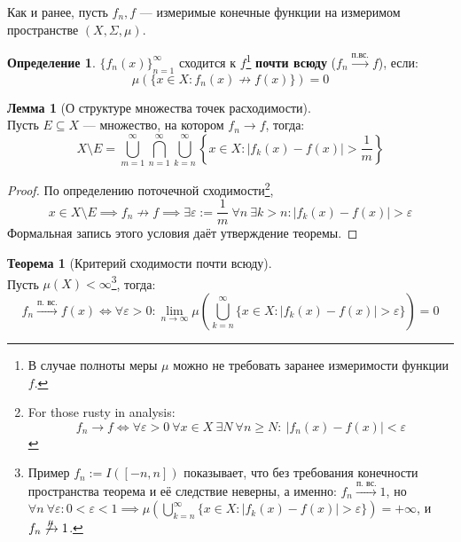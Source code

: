 \documentclass[11pt,a4paper]{report}
\def\eps{\varepsilon}
\theoremstyle{definition}
\theoremstyle{definition}
\newtheorem{theorem}{Теорема}[section]
\newtheorem{lemma}{Лемма}[section]
\theoremstyle{definition}
\newtheorem{definition}{Определение}[section]
\begin{document}
		\noindent Как и ранее, пусть $ f_{n}, f $ — измеримые конечные функции на измеримом пространстве $ (X, \Sigma, \mu) $.
		\begin{definition}
			$ \{f_{n}(x)\}_{n=1}^{\infty} $ сходится к $ f $\footnote{В случае полноты меры $ \mu $ можно не требовать заранее измеримости функции $ f $.} \textbf{почти всюду} ($ f_{n} \xrightarrow{\text{п.вс.}} f $), если: \[ \mu(\{x \in X: f_{n}(x) \not \rightarrow f(x) \}) = 0 \]
		\end{definition}
		\begin{lemma}[О структуре множества точек расходимости]$  $\\
			Пусть $ E \subseteq X $ — множество, на котором $ f_{n} \rightarrow f $, тогда:
			\[ X \setminus E = \bigcup\limits_{m=1}^{\infty}\bigcap\limits_{n=1}^{\infty}\bigcup\limits_{k=n}^{\infty}\left \{x \in X: |f_{k}(x) - f(x)| > \frac{1}{m} \right \} \]
		\end{lemma}
		\begin{proof} По определению поточечной сходимости\footnote{For those rusty in analysis: \[ f_{n} \rightarrow f \iff \forall \eps > 0\ \forall x \in X\ \exists N\ \forall n \ge N:\ |f_{n}(x) - f(x)| < \eps  \]}, 
			\[ x \in X \setminus E \implies f_{n} \not \rightarrow f \implies \exists \eps := \frac{1}{m}\ \forall n\ \exists k > n: |f_{k}(x) - f(x)| > \eps \]
			Формальная запись этого условия даёт утверждение теоремы.
		\end{proof}
		\begin{theorem}[Критерий сходимости почти всюду]$  $\\
			Пусть $ \mu(X) < \infty $\footnote{Пример $ f_{n} := I([-n, n]) $ показывает, что без требования конечности пространства теорема и её следствие неверны, а именно: $ f_{n} \xrightarrow{\text{п. вс.}} 1 $, но $ \forall n\ \forall \eps: 0 < \eps < 1 \implies \mu\left( \bigcup\limits_{k=n}^{\infty}\{x \in X: |f_{k}(x) - f(x)| > \eps \} \right) = +\infty $, и $ f_{n} \not \xrightarrow{\mu} 1 $.}, тогда: 
			\[ 
				f_{n} \xrightarrow{\text{п. вс.}} f(x) \iff \forall \eps > 0: \lim\limits_{n\to\infty}\mu\left( \bigcup\limits_{k=n}^{\infty}\{x \in X: |f_{k}(x) - f(x)| > \eps \} \right) = 0
			\]
		\end{theorem}
\end{document}
